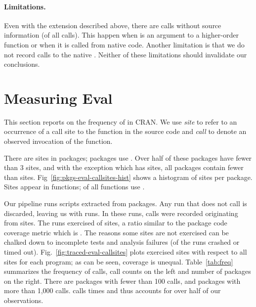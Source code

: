 \documentclass[review,screen,acmsmall]{acmart}%
\begin{document}
\paragraph{Limitations.} Even with the extension described above, there are
\PkgUndefinedRnd \eval calls without source information (\PkgUndefinedRatio of
all \eval calls). This happen when \eval is an argument to a higher-order
function or when it is called from native code. Another limitation is that we
do not record calls to the native \eval. Neither of these limitations should
invalidate our conclusions.

\section{Measuring Eval}

This section reports on the frequency of \eval in CRAN. We use \emph{site} to
refer to an occurrence of a call site to the \eval function in the source code
and \emph{call} to denote an observed invocation of the \eval function.

There are \PkgEvalCallSites \eval sites in \PkgPackages packages;
\PkgPackagesRatio packages use \eval. Over half of these packages have fewer
than 3 sites, and with the exception \MaxEvalCallSitesPackage which has
\MaxEvalCallSitesCount sites, all packages contain fewer than
\MaxEvalCallSitesRest sites. Fig~\ref{fig:pkgs-eval-callsites-hist} shows a
histogram of sites per package. Sites appear in \PkgFunsWithEval functions;
\CranFunsWithEvalRatio of all functions use \eval.

Our pipeline runs \CranRunnableScripts scripts extracted from \CranPackages
packages. Any run that does not call \eval is discarded, leaving us with
\packageNbruns runs. In these runs, \packageAllcalls \eval calls were recorded
originating from \PkgHitEvalCallSites sites. The runs exercised
\PkgHitEvalCallSitesAvgRatio of sites, a ratio similar to the package code
coverage metric which is \PkgCodeCoverage. The reasons some sites are not
exercised can be chalked down to incomplete tests and analysis failures
(\PkgFailedProgramsRatio of the runs crashed or timed out).
Fig.~\ref{fig:traced-eval-callsites} plots exercised sites with respect to all
sites for each program; as can be seen, coverage is unequal.
Table~\ref{tab:freq} summarizes the frequency of calls, call counts on the left and
number of packages on the right. There are \packageFewcalls packages with fewer
than 100 calls, and \packageManycalls packages with more than 1,000 calls.
\packageMaxcallspack calls \eval \packageMaxcalls times and thus accounts for
over half of our observations.
\end{document}
